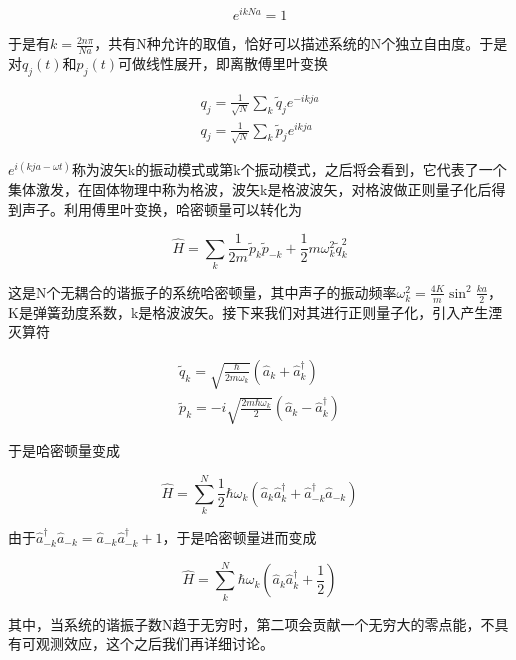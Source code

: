 \begin{equation}
    e^{ikNa}=1
\end{equation}

于是有$k=\frac{2n\pi}{Na}$，共有N种允许的取值，恰好可以描述系统的N个独立自由度。于是对$q_j(t)$和$p_j(t)$可做线性展开，即离散傅里叶变换

\begin{equation}
	\begin{array}{lr}
		q_j=\frac{1}{\sqrt{N}}\sum_{k}\tilde{q}_je^{-ikja} \\
		q_j=\frac{1}{\sqrt{N}}\sum_{k}\tilde{p}_je^{ikja}
	\end{array}
\end{equation}

$e^{i(kja-\omega t)}$称为波矢k的振动模式或第k个振动模式，之后将会看到，它代表了一个集体激发，在固体物理中称为格波，波矢k是格波波矢，对格波做正则量子化后得到声子。利用傅里叶变换，哈密顿量可以转化为

\begin{equation}
	\hat{H}=\sum_{k}\frac{1}{2m}\tilde{p}_k\tilde{p}_{-k}+\frac{1}{2}m\omega_k^2\tilde{q}_k^2
\end{equation}

这是N个无耦合的谐振子的系统哈密顿量，其中声子的振动频率$\omega_k^2=\frac{4K}{m}\sin^2\frac{ka}{2}$，K是弹簧劲度系数，k是格波波矢。接下来我们对其进行正则量子化，引入产生湮灭算符

\begin{equation}
	\begin{array}{lr}
		\tilde{q}_k=\sqrt{\frac{\hbar}{2m\omega_k}}(\hat{a}_k+\hat{a}_k^\dagger) \\
		\tilde{p}_k=-i\sqrt{\frac{2m\hbar\omega_k}{2}}(\hat{a}_k-\hat{a}_k^\dagger)
	\end{array}
\end{equation}

于是哈密顿量变成

\begin{equation}
	\hat{H}=\sum_{k}^N\frac{1}{2}\hbar\omega_k(\hat{a}_k\hat{a}_k^\dagger+\hat{a}_{-k}^\dagger\hat{a}_{-k})
\end{equation}

由于$\hat{a}_{-k}^\dagger\hat{a}_{-k}=\hat{a}_{-k}\hat{a}_{-k}^\dagger+1$，于是哈密顿量进而变成

\begin{equation}
	\hat{H}=\sum_{k}^N\hbar\omega_k(\hat{a}_k\hat{a}_k^\dagger+\frac{1}{2})
\end{equation}

其中，当系统的谐振子数N趋于无穷时，第二项会贡献一个无穷大的零点能，不具有可观测效应，这个之后我们再详细讨论。


